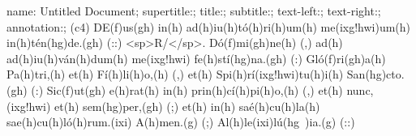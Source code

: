 name: Untitled Document;
supertitle:;
title:;
subtitle:;
text-left:;
text-right:;
annotation:;
(c4) DE(f)us(gh) in(h) ad(h)iu(h)tó(h)ri(h)um(h) me(ixg!hwi)um(h) in(h)tén(hg)de.(gh) (::) 
<sp>R/</sp>. Dó(f)mi(gh)ne(h) (,) ad(h) ad(h)iu(h)ván(h)dum(h) me(ixg!hwi) fe(h)stí(hg)na.(gh) (:) 
Gló(f)ri(gh)a(h) Pa(h)tri,(h) et(h) Fí(h)li(h)o,(h) (,) et(h) Spi(h)rí(ixg!hwi)tu(h)i(h) San(hg)cto.(gh) (:) 
Sic(f)ut(gh) e(h)rat(h) in(h) prin(h)cí(h)pi(h)o,(h) (,) et(h) nunc,(ixg!hwi) et(h) sem(hg)per,(gh) (;) et(h) in(h) saé(h)cu(h)la(h) sae(h)cu(h)ló(h)rum.(ixi) A(h)men.(g) (;) 
Al(h)le(ixi)lú(hg~){ia}.(g) (::)